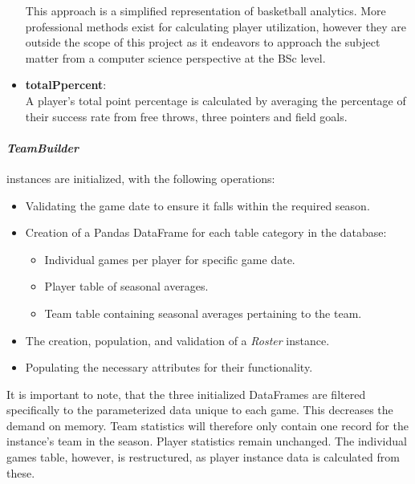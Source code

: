 \documentclass{thesis-ekf}
\theoremstyle{definition}
\theoremstyle{remark}
\begin{document}
\begin{itemize}
	This approach is a simplified representation of basketball analytics. More professional methods exist for calculating player utilization, however they are outside the scope of this project as it endeavors to approach the subject matter from a computer science perspective at the BSc level.
	
	\item \textbf{totalPpercent}: \\
	A player's total point percentage is calculated by averaging the percentage of their success rate from free throws, three pointers and field goals.

\end{itemize}


\paragraph{\emph{TeamBuilder}} instances are initialized, with the following operations:
\begin{itemize} 
	\item Validating the game date to ensure it falls within the required season.
	
	\item Creation of a Pandas DataFrame for each table category in the database:
	\begin{itemize}
		\item Individual games per player for specific game date.		
		\item Player table of seasonal averages.		
		\item Team table containing seasonal averages pertaining to the team.
	\end{itemize}
	
	\item The creation, population, and validation of a \emph{Roster} instance.
	
	\item Populating the necessary attributes for their functionality.	
\end{itemize}

It is important to note, that the three initialized DataFrames are filtered specifically to the parameterized data unique to each game. This decreases the demand on memory. Team statistics will therefore only contain one record for the instance's team in the season. Player statistics remain unchanged. The individual games table, however, is restructured, as player instance data is calculated from these.
\end{document}
